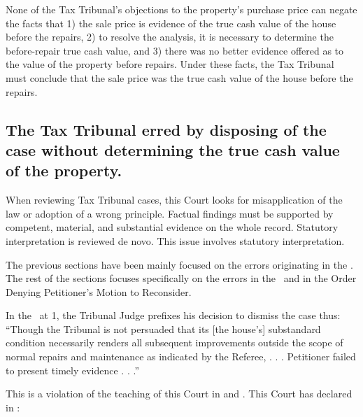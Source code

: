 \documentclass[12pt,\documentclassflag]{michiganCourtOfAppealsBrief}
\def\mathieuGast{\pincite[l]{MCL}{211.27(2)}}
\begin{document}
None of the Tax Tribunal's objections to the property's purchase price can negate the facts that 1) the sale price is evidence of the true cash value of the house before the repairs, 2) to resolve the \mathieuGast analysis, it is necessary to determine the before-repair true cash value, and 3) there was no better evidence offered as to the value of the property before repairs. Under these facts, the Tax Tribunal must conclude that the sale price was the true cash value of the house before the repairs.

\subsection{The Tax Tribunal erred by disposing of the case without determining the true cash value of the property.}

When reviewing Tax Tribunal cases, this Court looks for misapplication of the law or adoption of a wrong principle. Factual findings must be supported by competent, material, and substantial evidence on the whole record. Statutory interpretation is reviewed de novo.  This issue involves statutory interpretation.

The previous sections have been mainly focused on the errors originating in the \POJ. The rest of the sections focuses specifically on the errors in the \FOJ\ and in the Order Denying Petitioner's Motion to Reconsider.

In the \FOJ\ at 1, the Tribunal Judge prefixes his decision to dismiss the case thus: ``Though the Tribunal is not persuaded that its [the house's] substandard condition necessarily renders all subsequent improvements outside the scope of normal repairs and maintenance as indicated by the Referee, . . . Petitioner failed to present timely evidence . . .''

This is a violation of the teaching of this Court in \cite{Jones & Laughlin} and \cite{Fisher}. This Court has declared in :
\end{document}

